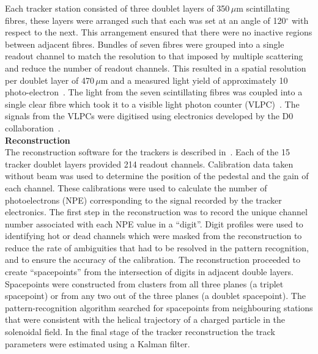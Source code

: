 Each tracker station consisted of three doublet layers of 350\,$\mu$m
scintillating fibres, these layers were arranged such that each was
set at an angle of 120$^\circ$ with respect to the next.
This arrangement ensured that there were no inactive regions between
adjacent fibres.
Bundles of seven fibres were grouped into a single readout channel to
match the resolution to that imposed by multiple scattering and
reduce the number of readout channels.
This resulted in a spatial resolution per doublet layer of 470\,$\mu$m
and a measured light yield of approximately 10
photo-electron~\cite{Ellis:2010bb}.
The light from the seven scintillating fibres was coupled into a
single clear fibre which took it to a visible light photon counter
(VLPC)~\cite{VLPC}.
The signals from the VLPCs were digitised using electronics developed
by the D0 collaboration~\cite{Abazov:2005pn}. \\

\noindent\textbf{Reconstruction} \\
\noindent
The reconstruction software for the trackers is described
in~\cite{Dobbs:2016ejn}.
Each of the 15 tracker doublet layers provided 214 readout channels.
Calibration data taken without beam was used to determine the position
of the pedestal and the gain of each channel.
These calibrations were used to calculate the number of photoelectrons
(NPE) corresponding to the signal recorded by the tracker
electronics.
The first step in the reconstruction was to record the unique channel
number associated with each NPE value in a ``digit''.
Digit profiles were used to identifying hot or dead channels which
were masked from the reconstruction to reduce the rate of ambiguities
that had to be resolved in the pattern recognition, and to ensure the
accuracy of the calibration.
The reconstruction proceeded to create ``spacepoints'' from the
intersection of digits in adjacent double layers.
Spacepoints were constructed from clusters from all three planes (a
triplet spacepoint) or from any two out of the three planes (a doublet
spacepoint).
The pattern-recognition algorithm searched for spacepoints from
neighbouring stations that were consistent with the helical trajectory
of a charged particle in the solenoidal field.
In the final stage of the tracker reconstruction the track parameters
were estimated using a Kalman filter. \\

